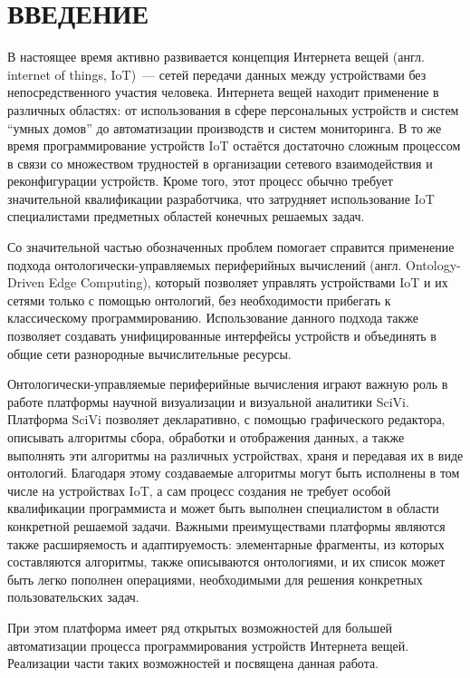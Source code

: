 \chapter*{ВВЕДЕНИЕ}

В настоящее время активно развивается концепция Интернета вещей (англ. internet of things, IoT)~--- сетей передачи данных между устройствами без непосредственного участия человека.
Интернета вещей находит применение в различных областях: от использования в сфере персональных устройств и систем "`умных домов"' до автоматизации производств и систем мониторинга.
В то же время программирование устройств IoT остаётся достаточно сложным процессом в связи со множеством трудностей в организации сетевого взаимодействия и реконфигурации устройств.
Кроме того, этот процесс обычно требует значительной квалификации разработчика, что затрудняет использование IoT специалистами предметных областей конечных решаемых задач.

Со значительной частью обозначенных проблем помогает справится применение подхода онтологически-управляемых периферийных вычислений (англ. Ontology-Driven Edge Computing), который позволяет управлять устройствами IoT и их сетями только с помощью онтологий, без необходимости прибегать к классическому программированию\cite{incollection:odec}.
Использование данного подхода также позволяет создавать унифицированные интерфейсы устройств и объединять в общие сети разнородные вычислительные ресурсы\cite{booktel:eon-communications}.

Онтологически-управляемые периферийные вычисления играют важную роль в работе платформы научной визуализации и визуальной аналитики SciVi\cite{article:scivi, article:scivi-overview}.
Платформа SciVi позволяет декларативно, с помощью графического редактора, описывать алгоритмы сбора, обработки и отображения данных, а также выполнять эти алгоритмы на различных устройствах, храня и передавая их в виде онтологий.
Благодаря этому создаваемые алгоритмы могут быть исполнены в том числе на устройствах IoT, а сам процесс создания не требует особой квалификации программиста и может быть выполнен специалистом в области конкретной решаемой задачи.
Важными преимуществами платформы являются также расширяемость и адаптируемость: элементарные фрагменты, из которых составляются алгоритмы, также описываются онтологиями, и их список может быть легко пополнен операциями, необходимыми для решения конкретных пользовательских задач.

При этом платформа имеет ряд открытых возможностей для большей автоматизации процесса программирования устройств Интернета вещей.
Реализации части таких возможностей и посвящена данная работа.


